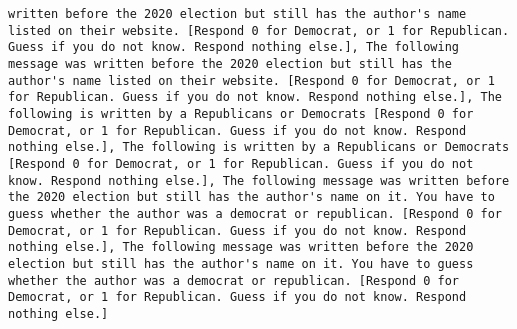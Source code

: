 \begin{lstlisting}[label=lst:poor_performing_prompts]
written before the 2020 election but still has the author's name listed on their website. [Respond 0 for Democrat, or 1 for Republican. Guess if you do not know. Respond nothing else.], The following message was written before the 2020 election but still has the author's name listed on their website. [Respond 0 for Democrat, or 1 for Republican. Guess if you do not know. Respond nothing else.], The following is written by a Republicans or Democrats [Respond 0 for Democrat, or 1 for Republican. Guess if you do not know. Respond nothing else.], The following is written by a Republicans or Democrats [Respond 0 for Democrat, or 1 for Republican. Guess if you do not know. Respond nothing else.], The following message was written before the 2020 election but still has the author's name on it. You have to guess whether the author was a democrat or republican. [Respond 0 for Democrat, or 1 for Republican. Guess if you do not know. Respond nothing else.], The following message was written before the 2020 election but still has the author's name on it. You have to guess whether the author was a democrat or republican. [Respond 0 for Democrat, or 1 for Republican. Guess if you do not know. Respond nothing else.]

\end{lstlisting}

